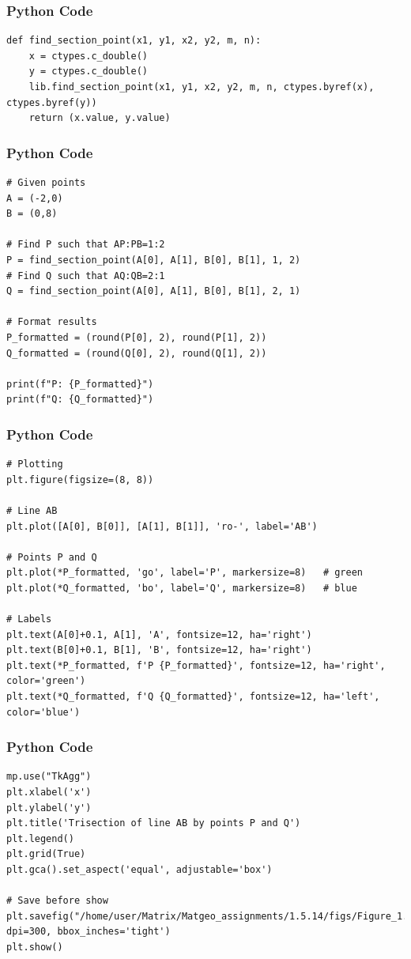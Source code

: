\documentclass{beamer}
\begin{document}
\begin{frame}[fragile]
    \frametitle{Python Code}
    \begin{lstlisting}
def find_section_point(x1, y1, x2, y2, m, n):
    x = ctypes.c_double()
    y = ctypes.c_double()
    lib.find_section_point(x1, y1, x2, y2, m, n, ctypes.byref(x), ctypes.byref(y))
    return (x.value, y.value)
    \end{lstlisting}
\end{frame}

\begin{frame}[fragile]
    \frametitle{Python Code}
    \begin{lstlisting}
# Given points
A = (-2,0)
B = (0,8)

# Find P such that AP:PB=1:2
P = find_section_point(A[0], A[1], B[0], B[1], 1, 2)
# Find Q such that AQ:QB=2:1
Q = find_section_point(A[0], A[1], B[0], B[1], 2, 1)

# Format results
P_formatted = (round(P[0], 2), round(P[1], 2))
Q_formatted = (round(Q[0], 2), round(Q[1], 2))

print(f"P: {P_formatted}")
print(f"Q: {Q_formatted}")
    \end{lstlisting}
\end{frame}

\begin{frame}[fragile]
    \frametitle{Python Code}
    \begin{lstlisting}
# Plotting
plt.figure(figsize=(8, 8))

# Line AB
plt.plot([A[0], B[0]], [A[1], B[1]], 'ro-', label='AB')

# Points P and Q
plt.plot(*P_formatted, 'go', label='P', markersize=8)   # green
plt.plot(*Q_formatted, 'bo', label='Q', markersize=8)   # blue

# Labels
plt.text(A[0]+0.1, A[1], 'A', fontsize=12, ha='right')
plt.text(B[0]+0.1, B[1], 'B', fontsize=12, ha='right')
plt.text(*P_formatted, f'P {P_formatted}', fontsize=12, ha='right', color='green')
plt.text(*Q_formatted, f'Q {Q_formatted}', fontsize=12, ha='left', color='blue')
    \end{lstlisting}
\end{frame}
\begin{frame}[fragile]
    \frametitle{Python Code}
    \begin{lstlisting}
mp.use("TkAgg")
plt.xlabel('x')
plt.ylabel('y')
plt.title('Trisection of line AB by points P and Q')
plt.legend()
plt.grid(True)
plt.gca().set_aspect('equal', adjustable='box')

# Save before show
plt.savefig("/home/user/Matrix/Matgeo_assignments/1.5.14/figs/Figure_1.png", dpi=300, bbox_inches='tight')
plt.show()
    \end{lstlisting}
\end{frame}
\end{document}
